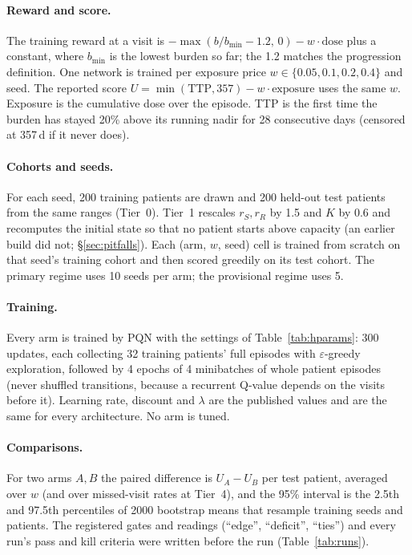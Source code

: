 \documentclass[10pt]{article}
\begin{document}
\paragraph{Reward and score.} The training reward at a visit is
$-\max(b/b_{\min}-1.2,\,0) - w\cdot\text{dose}$ plus a constant, where $b_{\min}$
is the lowest burden so far; the 1.2 matches the progression definition. One
network is trained per exposure price $w\in\{0.05,0.1,0.2,0.4\}$ and seed.
The reported score $U=\min(\mathrm{TTP},357)-w\cdot\text{exposure}$ uses the same $w$.
Exposure is the cumulative dose over the episode. TTP is the first time the burden has
stayed 20\% above its running nadir for 28 consecutive days (censored at 357\,d
if it never does).

\paragraph{Cohorts and seeds.} For each seed, 200 training patients are drawn
and 200 held-out test patients from the same ranges (Tier~0). Tier~1 rescales
$r_S, r_R$ by 1.5 and $K$ by 0.6 and recomputes the initial state so that no
patient starts above capacity (an earlier build did not; \S\ref{sec:pitfalls}).
Each (arm, $w$, seed) cell is trained from scratch on that seed's training
cohort and then scored greedily on its test cohort. The primary regime uses 10
seeds per arm; the provisional regime uses 5.

\paragraph{Training.} Every arm is trained by PQN with the settings of
Table~\ref{tab:hparams}: 300 updates, each collecting 32 training patients'
full episodes with $\varepsilon$-greedy exploration, followed by 4 epochs of
4 minibatches of whole patient episodes (never shuffled transitions, because a
recurrent Q-value depends on the visits before it). Learning rate, discount and
$\lambda$ are the published values and are the same for every architecture.
No arm is tuned.

\paragraph{Comparisons.} For two arms $A,B$ the paired difference is
$U_A-U_B$ per test patient, averaged over $w$ (and over missed-visit rates at
Tier~4), and the 95\% interval is the 2.5th and 97.5th percentiles of 2000
bootstrap means that resample training seeds and patients. The
registered gates and readings (``edge'', ``deficit'', ``ties'') and every run's
pass and kill criteria were written before the run (Table~\ref{tab:runs}).
\end{document}
